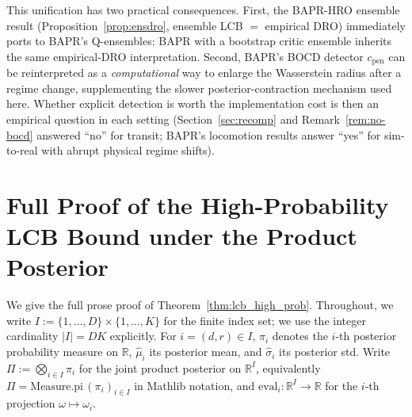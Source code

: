 \documentclass[11pt]{article}
\theoremstyle{definition}
\theoremstyle{remark}
\begin{document}
This unification has two practical consequences. First, the BAPR-HRO
ensemble result (Proposition~\ref{prop:ensdro}, ensemble LCB $=$
empirical DRO) immediately ports to BAPR's Q-ensembles: BAPR with a
bootstrap critic ensemble inherits the same empirical-DRO
interpretation. Second, BAPR's BOCD detector
$c_{\mathrm{pen}}$ can be reinterpreted as a \emph{computational} way
to enlarge the Wasserstein radius after a regime change, supplementing
the slower posterior-contraction mechanism used here. Whether explicit
detection is worth the implementation cost is then an empirical
question in each setting (Section~\ref{sec:recomp} and
Remark~\ref{rem:no-bocd} answered ``no'' for transit; BAPR's locomotion
results answer ``yes'' for sim-to-real with abrupt physical regime
shifts).

\section{Full Proof of the High-Probability LCB Bound under the Product Posterior}
\label{app:high_prob_proof}

We give the full prose proof of Theorem~\ref{thm:lcb_high_prob}.
Throughout, we write $I := \{1,\ldots,D\} \times \{1,\ldots,K\}$ for
the finite index set; we use the integer cardinality $|I| = DK$
explicitly. For $i = (d,r) \in I$, $\pi_i$ denotes the $i$-th
posterior probability measure on $\mathbb{R}$, $\hat\mu_i$ its
posterior mean, and $\hat\sigma_i$ its posterior std. Write
$\Pi := \bigotimes_{i \in I} \pi_i$ for the joint product
posterior on $\mathbb{R}^I$, equivalently
$\Pi = \mathrm{Measure.pi}\,(\pi_i)_{i \in I}$ in Mathlib notation,
and $\mathrm{eval}_i : \mathbb{R}^I \to \mathbb{R}$ for the $i$-th
projection $\omega \mapsto \omega_i$.
\end{document}
